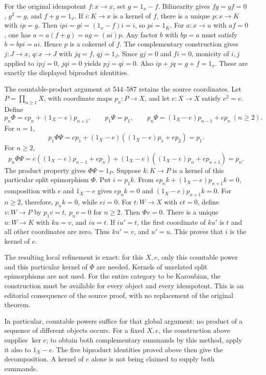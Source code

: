 For the original idempotent \(f:x\to x\), set \(g=1_x-f\). Bilinearity gives \(fg=gf=0\), \(g^2=g\), and \(f+g=1_x\). If \(i:K\to x\) is a kernel of \(f\), there is a unique \(p:x\to K\) with \(ip=g\). Then \(ipi=gi=(1_x-f)i=i\), so \(pi=1_K\). For \(a:x\to u\) with \(af=0\), one has \(a=a(f+g)=ag=(ai)p\). Any factor \(b\) with \(bp=a\) must satisfy \(b=bpi=ai\). Hence \(p\) is a cokernel of \(f\). The complementary construction gives \(j:J\to x\), \(q:x\to J\) with \(jq=f\), \(qj=1_J\). Since \(gj=0\) and \(fi=0\), monicity of \(i,j\) applied to \(ipj=0\), \(jqi=0\) yields \(pj=qi=0\). Also \(ip+jq=g+f=1_x\). These are exactly the displayed biproduct identities.

The countable-product argument at 544--587 retains the source coordinates. Let \(P=\prod_{n\geq1}X\), with coordinate maps \(p_n:P\to X\), and let \(e:X\to X\) satisfy \(e^2=e\). Define \[
p_n\Phi=e p_n+(1_X-e)p_{n+1},\qquad
p_1\Psi=p_1,\qquad
p_n\Psi=(1_X-e)p_{n-1}+e p_n\ (n\geq2).
\] For \(n=1\), \[
p_1\Phi\Psi=e p_1+(1_X-e)((1_X-e)p_1+e p_2)=p_1.
\] For \(n\geq2\), \[
p_n\Phi\Psi
=e((1_X-e)p_{n-1}+e p_n)
 +(1_X-e)((1_X-e)p_n+e p_{n+1})=p_n.
\] The product property gives \(\Phi\Psi=1_P\). Suppose \(k:K\to P\) is a kernel of this particular split epimorphism \(\Phi\). Put \(i=p_1k\). From \(e p_nk+(1_X-e)p_{n+1}k=0\), composition with \(e\) and \(1_X-e\) gives \(e p_nk=0\) and \((1_X-e)p_{n+1}k=0\). For \(n\geq2\), therefore, \(p_nk=0\), while \(ei=0\). For \(t:W\to X\) with \(et=0\), define \(v:W\to P\) by \(p_1v=t,\ p_nv=0\) for \(n\geq2\). Then \(\Phi v=0\). There is a unique \(u:W\to K\) with \(ku=v\), and \(iu=t\). If \(iu'=t\), the first coordinate of \(ku'\) is \(t\) and all other coordinates are zero. Thus \(ku'=v\), and \(u'=u\). This proves that \(i\) is the kernel of \(e\).

The resulting local refinement is exact: for this \(X,e\), only this countable power and this particular kernel of \(\Phi\) are needed. Kernels of unrelated split epimorphisms are not used. For the entire category to be Karoubian, the construction must be available for every object and every idempotent. This is an editorial consequence of the source proof, with no replacement of the original theorem.

In particular, countable powers suffice for that global argument: no product of a sequence of different objects occurs. For a fixed \(X,e\), the construction above supplies \(\ker e\); to obtain both complementary summands by this method, apply it also to \(1_X-e\). The five biproduct identities proved above then give the decomposition. A kernel of \(e\) alone is not being claimed to supply both summands.

